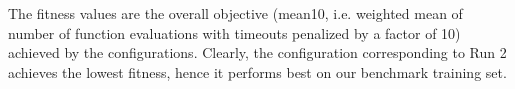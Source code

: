 The fitness values are the overall objective (mean10, i.e. weighted mean of number of function evaluations with timeouts penalized by a factor of 10) achieved by the configurations. Clearly, the configuration corresponding to Run 2 achieves the lowest fitness, hence it performs best on our benchmark training set.

